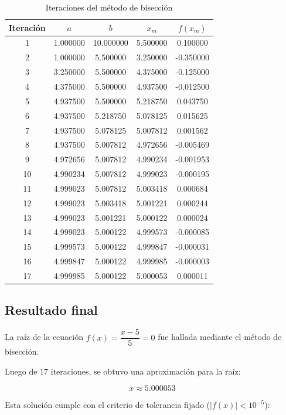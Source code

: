 \documentclass[12pt]{article}
\begin{document}
\begin{table}[H]
\centering
\caption{Iteraciones del método de bisección}
\begin{tabular}{@{}ccccc@{}}
\toprule
Iteración & $a$ & $b$ & $x_m$ & $f(x_m)$ \\
\midrule
1 & 1.000000 & 10.000000 & 5.500000 & 0.100000 \\
2 & 1.000000 & 5.500000 & 3.250000 & -0.350000 \\
3 & 3.250000 & 5.500000 & 4.375000 & -0.125000 \\
4 & 4.375000 & 5.500000 & 4.937500 & -0.012500 \\
5 & 4.937500 & 5.500000 & 5.218750 & 0.043750 \\
6 & 4.937500 & 5.218750 & 5.078125 & 0.015625 \\
7 & 4.937500 & 5.078125 & 5.007812 & 0.001562 \\
8 & 4.937500 & 5.007812 & 4.972656 & -0.005469 \\
9 & 4.972656 & 5.007812 & 4.990234 & -0.001953 \\
10 & 4.990234 & 5.007812 & 4.999023 & -0.000195 \\
11 & 4.999023 & 5.007812 & 5.003418 & 0.000684 \\
12 & 4.999023 & 5.003418 & 5.001221 & 0.000244 \\
13 & 4.999023 & 5.001221 & 5.000122 & 0.000024 \\
14 & 4.999023 & 5.000122 & 4.999573 & -0.000085 \\
15 & 4.999573 & 5.000122 & 4.999847 & -0.000031 \\
16 & 4.999847 & 5.000122 & 4.999985 & -0.000003 \\
17 & 4.999985 & 5.000122 & 5.000053 & 0.000011 \\
\bottomrule
\end{tabular}
\end{table}

\subsection*{Resultado final}

La raíz de la ecuación $f(x) = \dfrac{x - 5}{5} = 0$ fue hallada mediante el método de bisección.

Luego de 17 iteraciones, se obtuvo una aproximación para la raíz:

\[
\boxed{x \approx 5.000053}
\]

Esta solución cumple con el criterio de tolerancia fijado ($|f(x)| < 10^{-5}$):
\end{document}
